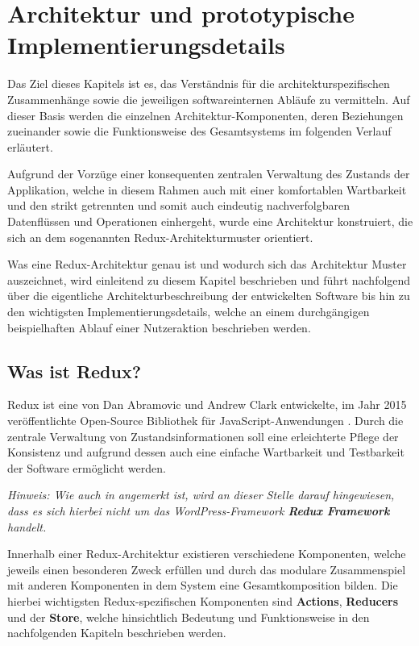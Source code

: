 \documentclass[bibliography=totoc,listof=totoc,BCOR=5mm,DIV=12,oneside]{scrbook}
\begin{document}
\newpage
\chapter{Architektur und  prototypische Implementierungsdetails} \label{chap:architektur}
\par Das Ziel dieses Kapitels ist es, das Verständnis für die architekturspezifischen Zusammenhänge sowie die jeweiligen softwareinternen Abläufe zu vermitteln. Auf dieser Basis werden die einzelnen Architektur-Komponenten, deren Beziehungen zueinander sowie die Funktionsweise des Gesamtsystems im folgenden Verlauf erläutert. 

\par \bigskip Aufgrund der Vorzüge einer konsequenten zentralen Verwaltung des Zustands der Applikation, welche in diesem Rahmen auch mit einer komfortablen Wartbarkeit und den strikt getrennten und somit auch eindeutig nachverfolgbaren Datenflüssen und Operationen einhergeht, wurde eine Architektur konstruiert, die sich an dem sogenannten Redux-Architekturmuster orientiert. 

\par \bigskip Was eine Redux-Architektur genau ist und wodurch sich das Architektur Muster auszeichnet, wird einleitend zu diesem Kapitel beschrieben und führt nachfolgend über die eigentliche Architekturbeschreibung der entwickelten Software bis hin zu den wichtigsten Implementierungsdetails, welche an einem durchgängigen beispielhaften Ablauf einer Nutzeraktion beschrieben werden.
	
\section{Was ist Redux?}
\label{sec:redux}
\par Redux ist eine von Dan Abramovic und Andrew Clark entwickelte, im Jahr 2015 veröffentlichte  Open-Source Bibliothek für JavaScript-Anwendungen \citep{ReduxWiki}. Durch die zentrale Verwaltung von Zustandsinformationen soll eine erleichterte Pflege der Konsistenz und aufgrund dessen auch eine \grqq einfache\grqq{} Wartbarkeit und Testbarkeit der Software ermöglicht werden. \citep{ReduxReadMe}
\par \bigskip \textit{Hinweis: Wie auch in \citep{ReduxReadMe} angemerkt ist, wird an dieser Stelle darauf hingewiesen, dass es sich hierbei nicht um das WordPress-Framework \textbf{Redux Framework}\citep{WordPressRedux} handelt.}

\par \bigskip Innerhalb einer Redux-Architektur existieren verschiedene Komponenten, welche jeweils einen besonderen Zweck erfüllen und durch das modulare Zusammenspiel mit anderen Komponenten in dem System eine Gesamtkomposition bilden. Die hierbei wichtigsten Redux-spezifischen Komponenten sind \textbf{Actions}, \textbf{Reducers} und der \textbf{Store}, welche hinsichtlich Bedeutung und Funktionsweise in den nachfolgenden Kapiteln beschrieben werden.
\end{document}
